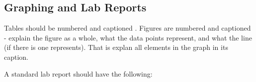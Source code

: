 \documentclass[12pt, a4paper, oneside, openright, titlepage]{book}
\begin{document}
\begin{appendices}
    

    

    \section{Graphing and Lab Reports}

    Tables should be numbered and captioned . Figures are numbered and captioned  - explain the figure as a whole, what the data points represent, and what the line (if there is one represents). That is explan all elements in the graph in its caption.

    A standard lab report should have the following:


\end{appendices}
\end{document}

